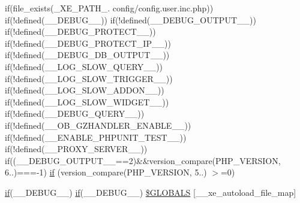 \begin{DoxyCompactItemize}
if(file\+\_\+exists(\+\_\+\+X\+E\+\_\+\+P\+A\+T\+H\+\_\+. \textquotesingle{}config/config.\+user.\+inc.\+php\textquotesingle{})) if(!defined(\textquotesingle{}\+\_\+\+\_\+\+D\+E\+B\+U\+G\+\_\+\+\_\+\textquotesingle{})) if(!defined(\textquotesingle{}\+\_\+\+\_\+\+D\+E\+B\+U\+G\+\_\+\+O\+U\+T\+P\+U\+T\+\_\+\+\_\+\textquotesingle{})) if(!defined(\textquotesingle{}\+\_\+\+\_\+\+D\+E\+B\+U\+G\+\_\+\+P\+R\+O\+T\+E\+C\+T\+\_\+\+\_\+\textquotesingle{})) if(!defined(\textquotesingle{}\+\_\+\+\_\+\+D\+E\+B\+U\+G\+\_\+\+P\+R\+O\+T\+E\+C\+T\+\_\+\+I\+P\+\_\+\+\_\+\textquotesingle{})) if(!defined(\textquotesingle{}\+\_\+\+\_\+\+D\+E\+B\+U\+G\+\_\+\+D\+B\+\_\+\+O\+U\+T\+P\+U\+T\+\_\+\+\_\+\textquotesingle{})) if(!defined(\textquotesingle{}\+\_\+\+\_\+\+L\+O\+G\+\_\+\+S\+L\+O\+W\+\_\+\+Q\+U\+E\+R\+Y\+\_\+\+\_\+\textquotesingle{})) if(!defined(\textquotesingle{}\+\_\+\+\_\+\+L\+O\+G\+\_\+\+S\+L\+O\+W\+\_\+\+T\+R\+I\+G\+G\+E\+R\+\_\+\+\_\+\textquotesingle{})) if(!defined(\textquotesingle{}\+\_\+\+\_\+\+L\+O\+G\+\_\+\+S\+L\+O\+W\+\_\+\+A\+D\+D\+O\+N\+\_\+\+\_\+\textquotesingle{})) if(!defined(\textquotesingle{}\+\_\+\+\_\+\+L\+O\+G\+\_\+\+S\+L\+O\+W\+\_\+\+W\+I\+D\+G\+E\+T\+\_\+\+\_\+\textquotesingle{})) if(!defined(\textquotesingle{}\+\_\+\+\_\+\+D\+E\+B\+U\+G\+\_\+\+Q\+U\+E\+R\+Y\+\_\+\+\_\+\textquotesingle{})) if(!defined(\textquotesingle{}\+\_\+\+\_\+\+O\+B\+\_\+\+G\+Z\+H\+A\+N\+D\+L\+E\+R\+\_\+\+E\+N\+A\+B\+L\+E\+\_\+\+\_\+\textquotesingle{})) if(!defined(\textquotesingle{}\+\_\+\+\_\+\+E\+N\+A\+B\+L\+E\+\_\+\+P\+H\+P\+U\+N\+I\+T\+\_\+\+T\+E\+S\+T\+\_\+\+\_\+\textquotesingle{})) if(!defined(\textquotesingle{}\+\_\+\+\_\+\+P\+R\+O\+X\+Y\+\_\+\+S\+E\+R\+V\+E\+R\+\_\+\+\_\+\textquotesingle{})) if((\+\_\+\+\_\+\+D\+E\+B\+U\+G\+\_\+\+O\+U\+T\+P\+U\+T\+\_\+\+\_\+==2)\&\&version\+\_\+compare(P\+H\+P\+\_\+\+V\+E\+R\+S\+I\+O\+N, \textquotesingle{}6..\textquotesingle{})===-\/1) \hyperlink{config_8inc_8php_ac202e21c80d0f28d495d074d3c23e1ca}{if} (version\+\_\+compare(P\+H\+P\+\_\+\+V\+E\+R\+S\+I\+O\+N, \textquotesingle{}5..\textquotesingle{}) $>$=0)
\item 
\hyperlink{config_8inc_8php_ac202e21c80d0f28d495d074d3c23e1ca}{if}(\+\_\+\+\_\+\+D\+E\+B\+U\+G\+\_\+\+\_\+) \hyperlink{config_8inc_8php_ac202e21c80d0f28d495d074d3c23e1ca}{if}(\+\_\+\+\_\+\+D\+E\+B\+U\+G\+\_\+\+\_\+) \hyperlink{config_8inc_8php_a2843c2516649b5d9554f09b06b7b810a}{\$\+G\+L\+O\+B\+A\+L\+S} \mbox{[}\textquotesingle{}\+\_\+\+\_\+xe\+\_\+autoload\+\_\+file\+\_\+map\textquotesingle{}\mbox{]}
\end{DoxyCompactItemize}


